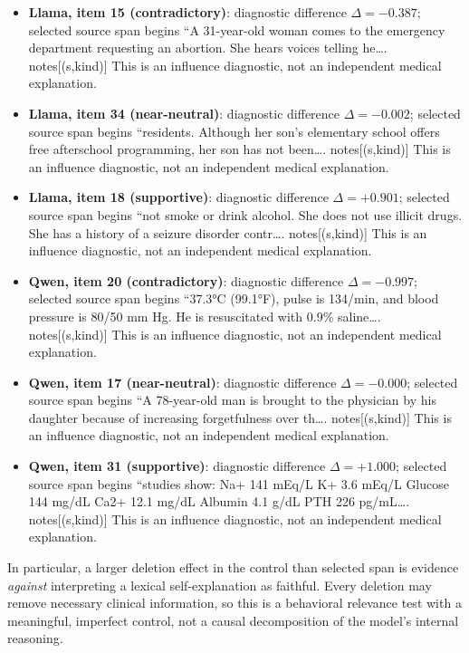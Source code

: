 \documentclass[10pt,a4paper,twocolumn]{article}
\begin{document}
\begin{itemize}\setlength\itemsep{1pt}
\item \textbf{Llama, item 15 (contradictory)}: diagnostic difference $\Delta=-0.387$; selected source span begins ``A 31-year-old woman comes to the emergency department requesting an abortion. She hears voices telling he\ldots. {notes[(s,kind)]} This is an influence diagnostic, not an independent medical explanation.
\item \textbf{Llama, item 34 (near-neutral)}: diagnostic difference $\Delta=-0.002$; selected source span begins ``residents. Although her son's elementary school offers free afterschool programming, her son has not been\ldots. {notes[(s,kind)]} This is an influence diagnostic, not an independent medical explanation.
\item \textbf{Llama, item 18 (supportive)}: diagnostic difference $\Delta=+0.901$; selected source span begins ``not smoke or drink alcohol. She does not use illicit drugs. She has a history of a seizure disorder contr\ldots. {notes[(s,kind)]} This is an influence diagnostic, not an independent medical explanation.
\item \textbf{Qwen, item 20 (contradictory)}: diagnostic difference $\Delta=-0.997$; selected source span begins ``37.3°C (99.1°F), pulse is 134/min, and blood pressure is 80/50 mm Hg. He is resuscitated with 0.9\% saline\ldots. {notes[(s,kind)]} This is an influence diagnostic, not an independent medical explanation.
\item \textbf{Qwen, item 17 (near-neutral)}: diagnostic difference $\Delta=-0.000$; selected source span begins ``A 78-year-old man is brought to the physician by his daughter because of increasing forgetfulness over th\ldots. {notes[(s,kind)]} This is an influence diagnostic, not an independent medical explanation.
\item \textbf{Qwen, item 31 (supportive)}: diagnostic difference $\Delta=+1.000$; selected source span begins ``studies show: Na+ 141 mEq/L K+ 3.6 mEq/L Glucose 144 mg/dL Ca2+ 12.1 mg/dL Albumin 4.1 g/dL PTH 226 pg/mL\ldots. {notes[(s,kind)]} This is an influence diagnostic, not an independent medical explanation.
\end{itemize}
In particular, a larger deletion effect in the control than selected span is evidence \emph{against} interpreting a lexical self-explanation as faithful. Every deletion may remove necessary clinical information, so this is a behavioral relevance test with a meaningful, imperfect control, not a causal decomposition of the model's internal reasoning.
\end{document}
